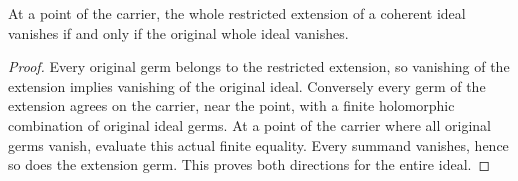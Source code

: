 \begin{lemma}
\label{hir:sharp-actual-restricted-whole-zero-locus}
\leanok
At a point of the carrier, the whole restricted extension of a coherent
ideal vanishes if and only if the original whole ideal vanishes.
\end{lemma}
\begin{proof}
Every original germ belongs to the restricted extension, so vanishing of
the extension implies vanishing of the original ideal. Conversely every
germ of the extension agrees on the carrier, near the point, with a finite
holomorphic combination of original ideal germs. At a point of the carrier
where all original germs vanish, evaluate this actual finite equality.
Every summand vanishes, hence so does the extension germ. This proves both
directions for the entire ideal.
\end{proof}

